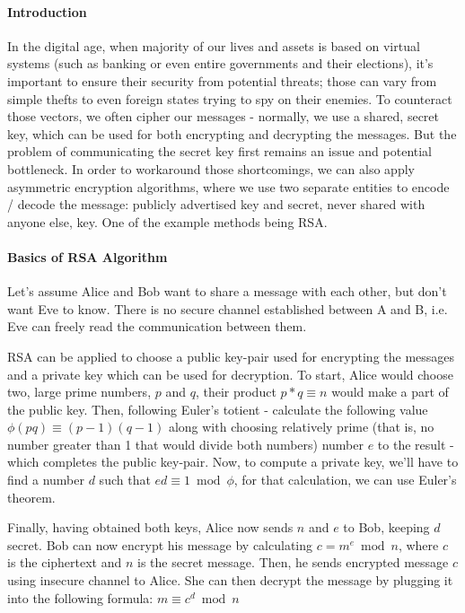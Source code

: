 \documentclass[11pt]{article}
\author{Group Project 1 \\
  Konrad Dryja, 51552177 \\
  Alexandra Riddell, 123 \\
  Danah Alshuaib, 123 \\
  Ogtay Magsudov, 123 \\
  Daniel Rennie, 123 \\
  Waleed Totakhyl, 123}
\begin{document}
\maketitle
\begin{multicols}{2}

\paragraph{Introduction}
In the digital age, when majority of our lives and assets is based on virtual systems (such as banking or even entire governments and their elections), it's important to ensure their security from potential threats; those can vary from simple thefts to even foreign states trying to spy on their enemies. To counteract those vectors, we often cipher our messages - normally, we use a shared, secret key, which can be used for both encrypting and decrypting the messages. But the problem of communicating the secret key first remains an issue and potential bottleneck. In order to workaround those shortcomings, we can also apply asymmetric encryption algorithms, where we use two separate entities to encode / decode the message: publicly advertised key and secret, never shared with anyone else, key. One of the example methods being RSA.

\paragraph{Basics of RSA Algorithm}
Let's assume Alice and Bob want to share a message with each other, but don't want Eve to know. There is no secure channel established between A and B, i.e. Eve can freely read the communication between them.

RSA can be applied to choose a public key-pair used for encrypting the messages and a private key which can be used for decryption. To start, Alice would choose two, large prime numbers, $p$ and $q$, their product $p*q \equiv n$ would make a part of the public key. Then, following Euler's totient - calculate the following value $\phi(pq) \equiv (p-1)(q-1)$ along with choosing relatively prime (that is, no number greater than 1 that would divide both numbers) number $e$ to the result - which completes the public key-pair. Now, to compute a private key, we'll have to find a number $d$ such that \(ed \equiv 1 \bmod \phi\), for that calculation, we can use Euler's theorem.

Finally, having obtained both keys, Alice now sends $n$ and $e$ to Bob, keeping $d$ secret. Bob can now encrypt his message by calculating \(c = m^e \bmod n\), where $c$ is the ciphertext and $n$ is the secret message. Then, he sends encrypted message $c$ using insecure channel to Alice. She can then decrypt the message by plugging it into the following formula: $m \equiv c^d \bmod n$



\end{multicols}
\end{document}
